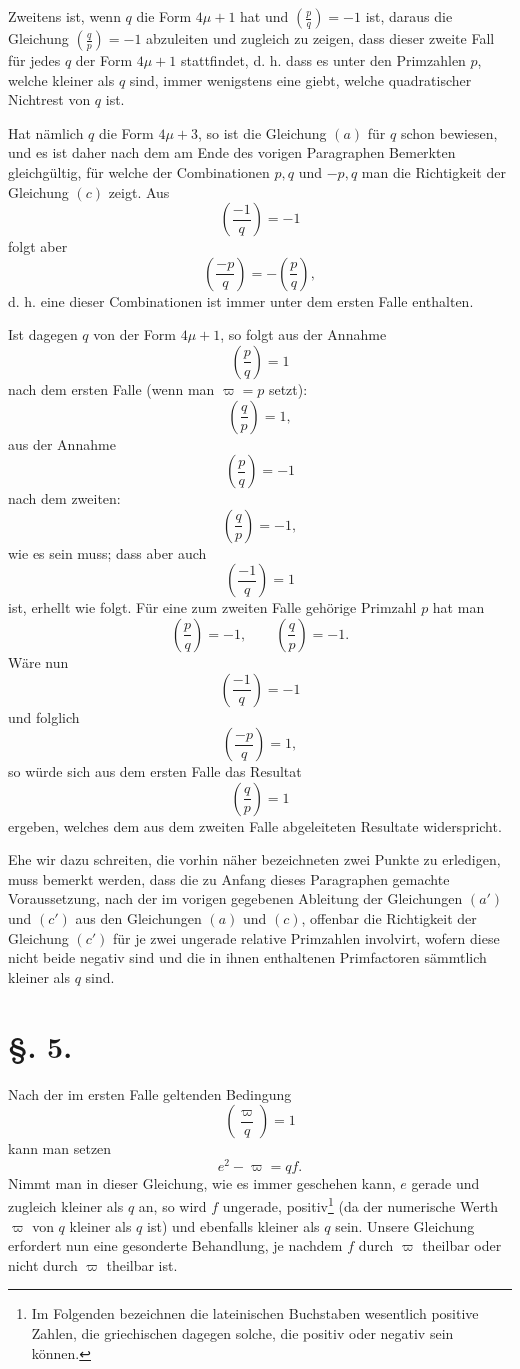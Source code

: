 \documentclass[11pt]{article}
\newcommand{\J}[2]{\left(\frac{#1}{#2}\right)}
\begin{document}
Zweitens ist, wenn $q$ die Form $4\mu+1$ hat und $\J{p}{q}=-1$ ist, daraus die Gleichung $\J{q}{p}=-1$ abzuleiten und zugleich zu zeigen, dass dieser zweite Fall für jedes $q$ der Form $4\mu+1$ stattfindet, d. h. dass es unter den Primzahlen $p$, welche kleiner als $q$ sind, immer wenigstens eine giebt, welche quadratischer Nichtrest von $q$ ist.

Hat nämlich $q$ die Form $4\mu+3$, so ist die Gleichung $(a)$ für $q$ schon bewiesen, und es ist daher nach dem am Ende des vorigen Paragraphen Bemerkten gleichgültig, für welche der Combinationen $p,q$ und $-p,q$ man die Richtigkeit der Gleichung $(c)$ zeigt. Aus
\[
 \J{-1}{q}=-1
\]
folgt aber
\[
 \J{-p}{q}=-\J{p}{q},
\]
d. h. eine dieser Combinationen ist immer unter dem ersten Falle enthalten.

Ist dagegen $q$ von der Form $4\mu+1$, so folgt aus der Annahme
\[
 \J{p}{q}=1
\]
nach dem ersten Falle (wenn man $\varpi=p$ setzt):
\[
 \J{q}{p}=1,
\]
aus der Annahme
\[
 \J{p}{q}=-1
\]
nach dem zweiten:
\[
 \J{q}{p}=-1,
\]
wie es sein muss; dass aber auch
\[
 \J{-1}{q}=1
\]
ist, erhellt wie folgt. Für eine zum zweiten Falle gehörige Primzahl $p$ hat man
\[
 \J{p}{q}=-1,\qquad \J{q}{p}=-1.
\]
Wäre nun
\[
 \J{-1}{q}=-1
\]
und folglich
\[
 \J{-p}{q}=1,
\]
so würde sich aus dem ersten Falle das Resultat
\[
 \J{q}{p}=1
\]
ergeben, welches dem aus dem zweiten Falle abgeleiteten Resultate widerspricht.

Ehe wir dazu schreiten, die vorhin näher bezeichneten zwei Punkte zu erledigen, muss bemerkt werden, dass die zu Anfang dieses Paragraphen gemachte Voraussetzung, nach der im vorigen gegebenen Ableitung der Gleichungen $(a')$ und $(c')$ aus den Gleichungen $(a)$ und $(c)$, offenbar die Richtigkeit der Gleichung $(c')$ für je zwei ungerade relative Primzahlen involvirt, wofern diese nicht beide negativ sind und die in ihnen enthaltenen Primfactoren sämmtlich kleiner als $q$ sind.

\section*{\S. 5.}

Nach der im ersten Falle geltenden Bedingung
\[
 \J{\varpi}{q}=1
\]
kann man setzen
\[
 e^2-\varpi=qf.
\]
Nimmt man in dieser Gleichung, wie es immer geschehen kann, $e$ gerade und zugleich kleiner als $q$ an, so wird $f$ ungerade, positiv\footnote{Im Folgenden bezeichnen die lateinischen Buchstaben wesentlich positive Zahlen, die griechischen dagegen solche, die positiv oder negativ sein können.} (da der numerische Werth $\varpi$ von $q$ kleiner als $q$ ist) und ebenfalls kleiner als $q$ sein. Unsere Gleichung erfordert nun eine gesonderte Behandlung, je nachdem $f$ durch $\varpi$ theilbar oder nicht durch $\varpi$ theilbar ist.
\end{document}
